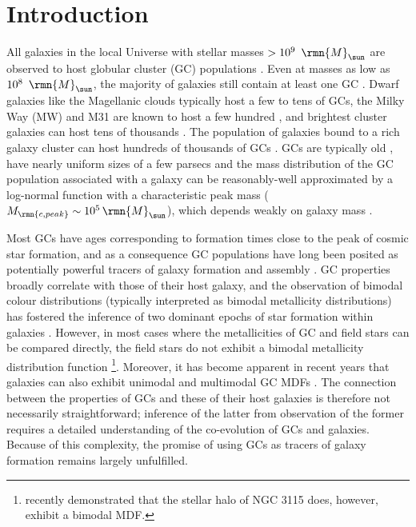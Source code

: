 \documentclass[fleqn,usenatbib]{mnras}
\newcommand\Msun{\,\rmn{M}_{\sun}}
\begin{document}



\section{Introduction}

All galaxies in the local Universe with stellar masses $>10^9~\Msun$ are observed to host globular cluster (GC) populations \citep[for recent reviews, see e.g.][]{Brodie_and_Strader_06, Kruijssen_14}. Even at masses as low as $10^8~\Msun$, the majority of galaxies still contain at least one GC \citep[e.g.][]{Georgiev_et_al_10}. Dwarf galaxies like the Magellanic clouds typically host a few to tens of GCs, the Milky Way (MW) and M31 are known to host a few hundred \citep{Harris_91}, and brightest cluster galaxies can host tens of thousands \citep{Peng_et_al_08, Harris_et_al_17}. The population of galaxies bound to a rich galaxy cluster can host hundreds of thousands of GCs \citep{Alamo-Martinez_et_al_13}. GCs are typically old \citep[ages $>$10 Gyr,][]{Puzia_et_al_05, Strader_et_al_05, Marin-Franch_et_al_09, VandenBerg_et_al_13}, have nearly uniform sizes of a few parsecs \citep{Kundu_and_Whitmore_01, Masters_et_al_10} and the mass distribution of the GC population associated with a galaxy can be reasonably-well approximated by a log-normal function with a characteristic peak mass ($M_\rmn{c,peak} \sim 10^5 \Msun$), which depends weakly on galaxy mass \citep{Harris_91, Jordan_et_al_07_XII}.

Most GCs have ages corresponding to formation times close to the peak of cosmic star formation, and as a consequence GC populations have long been posited as potentially powerful tracers of galaxy formation and assembly \citep[see e.g.~reviews by][]{Harris_91, Brodie_and_Strader_06}.
GC properties broadly correlate with those of their host galaxy, and the observation of bimodal colour distributions (typically interpreted as bimodal metallicity distributions) has fostered the inference of two dominant epochs of star formation within galaxies \citep{Brodie_and_Strader_06}. However, in most cases where the metallicities of GC and field stars can be compared directly, the field stars do not exhibit a bimodal metallicity distribution function \citep[MDF; e.g.][]{Harris_and_Harris_02, Harris_et_al_07, Rejkuba_et_al_11, Lamers_et_al_17}\footnote{\citet{Peacock_et_al_15} recently demonstrated that the stellar halo of NGC 3115 does, however, exhibit a bimodal MDF.}. Moreover, it has become apparent in recent years that galaxies can also exhibit unimodal \citep{Caldwell_et_al_11, Harris_et_al_17} and multimodal GC MDFs \citep[which may also depend on cluster luminosity,][]{Usher_et_al_12}.  The connection between the properties of GCs and these of their host galaxies is therefore not necessarily straightforward; inference of the latter from observation of the former requires a detailed understanding of the co-evolution of GCs and galaxies. Because of this complexity, the promise of using GCs as tracers of galaxy formation remains largely unfulfilled.
\end{document}
